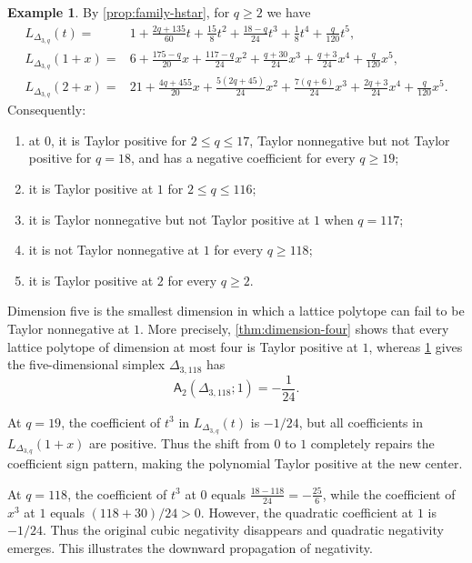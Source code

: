 \documentclass[reqno, 12pt]{article}
\numberwithin{equation}{section}
\theoremstyle{definition}
\newtheorem{example}[theorem]{Example}
\newcommand{\A}{\mathsf{A}}
\begin{document}
\begin{example}\label{prop:d5-family}
By \cref{prop:family-hstar}, for $q\geq2$ we have 
\begin{align*}
 L_{\Delta_{3,q}}(t)={}&1+\frac{2q+135}{60}t+\frac{15}{8}t^2+\frac{18-q}{24}t^3+\frac18t^4+\frac q{120}t^5,\\
 L_{\Delta_{3,q}}(1+x)={}&6+\frac{175-q}{20}x+\frac{117-q}{24}x^2+\frac{q+30}{24}x^3+\frac{q+3}{24}x^4+\frac q{120}x^5,\\
 L_{\Delta_{3,q}}(2+x)={}&21+\frac{4q+455}{20}x+\frac{5(2q+45)}{24}x^2+\frac{7(q+6)}{24}x^3+\frac{2q+3}{24}x^4+\frac q{120}x^5.
\end{align*}
Consequently:
\begin{enumerate}
 \item at $0$, it is Taylor positive for $2\leq q\leq17$, Taylor nonnegative but not Taylor positive for $q=18$, and has a negative
 coefficient for every $q\geq19$;
 \item it is Taylor positive at $1$ for $2\leq q\leq116$;
 \item it is Taylor nonnegative but not Taylor positive at $1$ when $q=117$;
 \item it is not Taylor nonnegative at $1$ for every $q\geq118$;
 \item it is Taylor positive at $2$ for every $q\geq2$.
\end{enumerate}
\end{example}

Dimension five is the smallest dimension in which a lattice polytope can fail to be Taylor nonnegative at $1$.  More precisely,      
\cref{thm:dimension-four} shows that every lattice polytope of dimension at most four is Taylor positive at $1$, whereas 
\cref{prop:d5-family} gives the five-dimensional simplex $\Delta_{3,118}$ has
\[\A_2(\Delta_{3,118};1)=-\frac1{24}.\]



At $q=19$, the coefficient of $t^3$ in $L_{\Delta_{3,q}}(t)$ is $-1/24$, but all coefficients in $L_{\Delta_{3,q}}(1+x)$ are positive. Thus the shift from $0$ to $1$ completely repairs the coefficient sign pattern, making the polynomial Taylor positive at the new center.

At $q=118$, the coefficient of $t^3$ at $0$ equals $\frac{18-118}{24}=-\frac{25}{6}$,
while the coefficient of $x^3$ at $1$ equals $(118+30)/24>0$.  However, the quadratic coefficient at $1$ is
$-1/24$.  Thus the original cubic negativity disappears and quadratic negativity emerges.  This illustrates the downward propagation of negativity.
\end{document}
